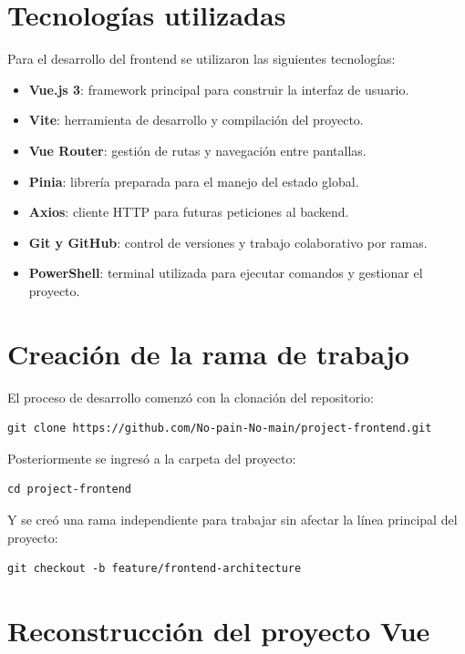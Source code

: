 \documentclass[12pt]{article}
\begin{document}
\section{Tecnologías utilizadas}

Para el desarrollo del frontend se utilizaron las siguientes tecnologías:

\begin{itemize}
    \item \textbf{Vue.js 3}: framework principal para construir la interfaz de usuario.
    \item \textbf{Vite}: herramienta de desarrollo y compilación del proyecto.
    \item \textbf{Vue Router}: gestión de rutas y navegación entre pantallas.
    \item \textbf{Pinia}: librería preparada para el manejo del estado global.
    \item \textbf{Axios}: cliente HTTP para futuras peticiones al backend.
    \item \textbf{Git y GitHub}: control de versiones y trabajo colaborativo por ramas.
    \item \textbf{PowerShell}: terminal utilizada para ejecutar comandos y gestionar el proyecto.
\end{itemize}

\section{Creación de la rama de trabajo}

El proceso de desarrollo comenzó con la clonación del repositorio:

\begin{verbatim}
git clone https://github.com/No-pain-No-main/project-frontend.git
\end{verbatim}

Posteriormente se ingresó a la carpeta del proyecto:

\begin{verbatim}
cd project-frontend
\end{verbatim}

Y se creó una rama independiente para trabajar sin afectar la línea principal del proyecto:

\begin{verbatim}
git checkout -b feature/frontend-architecture
\end{verbatim}

\section{Reconstrucción del proyecto Vue}
\end{document}
